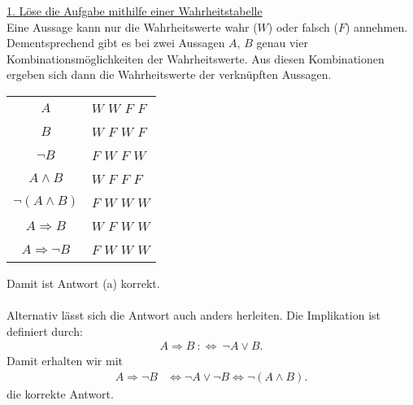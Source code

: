 \underline{1. Löse die Aufgabe mithilfe einer Wahrheitstabelle}\\
Eine Aussage kann nur die Wahrheitswerte wahr ($ W $) oder falsch ($ F $) annehmen.
Dementsprechend gibt es bei zwei Aussagen $ A $, $ B $ genau vier Kombinationsmöglichkeiten der Wahrheitswerte.
Aus diesen Kombinationen ergeben sich dann die Wahrheitswerte der verknüpften Aussagen.
\begin{center}
	\begin{tabular}{cllll}
		\hline
		\multicolumn{1}{c|}{$A$} & \multicolumn{4}{l}{$W$ $W$ $F$ $F$} \\
		\multicolumn{1}{c|}{$B$} & \multicolumn{4}{l}{$W$ $F$ $W$ $F$} \\ 
		\hline
		\multicolumn{1}{c|}{$\neg B$} & \multicolumn{4}{l}{$F$ $W$ $F$ $W$} \\
		\hline
		\multicolumn{1}{c|}{ $ A \wedge B$} & \multicolumn{4}{l}{$W$ $F$ $F$ $F$} \\
		\multicolumn{1}{c|}{$ \neg (A \wedge B)$} & \multicolumn{4}{l}{$F$ $W$ $W$ $W$} \\
		\hline
		\multicolumn{1}{c|}{$ A \Rightarrow B$} & \multicolumn{4}{l}{$W$ $F$ $W$ $W$} \\
		\multicolumn{1}{c|}{$ A \Rightarrow  \neg B$} & \multicolumn{4}{l}{$F$ $W$ $W$ $W$} \\  	
		\hline	
	\end{tabular}
\end{center}
Damit ist Antwort (a) korrekt. \\
\\
Alternativ lässt sich die Antwort auch anders herleiten.
Die Implikation ist definiert durch:
\begin{align*}
	A \Rightarrow B \ :\Leftrightarrow \ \neg A \vee B.
\end{align*}
Damit erhalten wir mit
\begin{align*}
	A \Rightarrow \neg B 
	&\Leftrightarrow
	\neg A \vee \neg B
	\Leftrightarrow
	\neg (A \wedge B).
\end{align*}
die korrekte Antwort.


\newpage

